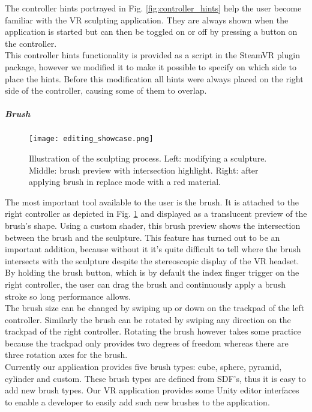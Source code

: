 The controller hints portrayed in Fig. \ref{fig:controller_hints} help the user become familiar with the VR sculpting application. They are always shown when the application is started but can then be toggled on or off by pressing a button on the controller.\\
This controller hints functionality is provided as a script in the SteamVR plugin package, however we modified it to make it possible to specify on which side to place the hints. Before this modification all hints were always placed on the right side of the controller, causing some of them to overlap.

\subparagraph{Brush}

\begin{figure}
\centering
\captionsetup{width=0.8\textwidth}
\texttt{[image: editing\_showcase.png]}
\caption{Illustration of the sculpting process. Left: modifying a sculpture. Middle: brush preview with intersection highlight. Right: after applying brush in replace mode with a red material.}
\label{fig:editing_showcase}
\end{figure}

The most important tool available to the user is the brush. It is attached to the right controller as depicted in Fig. \ref{fig:editing_showcase} and displayed as a translucent preview of the brush's shape. Using a custom shader, this brush preview shows the intersection between the brush and the sculpture. This feature has turned out to be an important addition, because without it it's quite difficult to tell where the brush intersects with the sculpture despite the stereoscopic display of the VR headset.\\
By holding the brush button, which is by default the index finger trigger on the right controller, the user can drag the brush and continuously apply a brush stroke so long performance allows.\\
The brush size can be changed by swiping up or down on the trackpad of the left controller. Similarly the brush can be rotated by swiping any direction on the trackpad of the right controller. Rotating the brush however takes some practice because the trackpad only provides two degrees of freedom whereas there are three rotation axes for the brush.\\
Currently our application provides five brush types: cube, sphere, pyramid, cylinder and custom. These brush types are defined from SDF's, thus it is easy to add new brush types. Our VR application provides some Unity editor interfaces to enable a developer to easily add such new brushes to the application.

